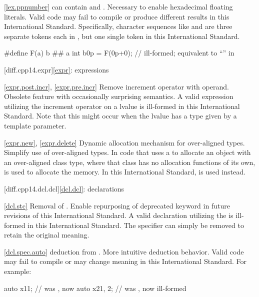 \ref{lex.ppnumber}
\change {} can contain   and
 .
\rationale Necessary to enable hexadecimal floating literals.
\effect
Valid \CppXIV code may fail to compile or produce different results in
this International Standard. Specifically, character sequences like 
and  are three separate tokens each in \CppXIV, but one single token
in this International Standard.

\begin{codeblock}
#define F(a) b ## a
int b0p = F(0p+0);  // ill-formed; equivalent to ``\!'' in \CppXIV
\end{codeblock}

[diff.cpp14.expr]{\ref{expr}: expressions}

\ref{expr.post.incr}, \ref{expr.pre.incr}
\change
Remove increment operator with  operand.
\rationale Obsolete feature with occasionally surprising semantics.
\effect A valid \CppXIV expression utilizing the increment operator on
a  lvalue is ill-formed in this International Standard.
Note that this might occur when the lvalue has a type given by a template
parameter.

\ref{expr.new}, \ref{expr.delete}
\change Dynamic allocation mechanism for over-aligned types.
\rationale Simplify use of over-aligned types.
\effect In \CppXIV code that uses a 
to allocate an object with an over-aligned class type,
where that class has no allocation functions of its own,
is used to allocate the memory.
In this International Standard,
is used instead.

[diff.cpp14.dcl.dcl]{\ref{dcl.dcl}: declarations}

\ref{dcl.stc}
%
\change Removal of  .
\rationale Enable repurposing of deprecated keyword in future revisions of this International Standard.
\effect
A valid \CppXIV declaration utilizing the 
 is ill-formed in this International Standard.
The specifier can simply be removed to retain the original meaning.

\ref{dcl.spec.auto}
\change {} deduction from .
\rationale More intuitive deduction behavior.
\effect
Valid \CppXIV code may fail to compile or may change meaning
in this International Standard. For example:
\begin{codeblock}
auto x1{1};    // was , now 
auto x2{1, 2}; // was , now ill-formed
\end{codeblock}

